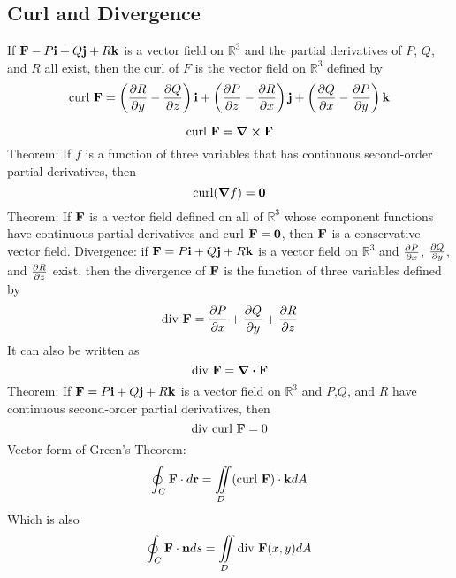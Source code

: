 \documentclass{article}
\begin{document}
    \subsection{Curl and Divergence}
    \begin{outline}
        \1 If \(\vb F-P\vb i+Q\vb j+R\vb k\) is a vector field on \(\mathbb R^3\) and the partial derivatives of $P$, $Q$, and $R$ all exist, then the curl of $F$ is the vector field on \(\mathbb R^3\) defined by \[\text{curl }\vb F=\left(\pdv{R}{y}-\pdv{Q}{z}\right)\vb i+\left(\pdv{P}{z}-\pdv{R}{x}\right)\vb j+\left(\pdv{Q}{x}-\pdv{P}{y}\right)\vb k\] 
    \end{outline}
        
        \begin{outline}
        \1 \[\text{curl }\vb F=\curl\vb F\]
        \1 Theorem: If $f$ is a function of three variables that has continuous second-order partial derivatives, then \[\text{curl}(\grad f)=\vb 0\]
        \1 Theorem: If \(\vb F\) is a vector field defined on all of \(\mathbb R^3\) whose component functions have continuous partial derivatives and curl \(\vb F=\vb 0\), then \(\vb F\) is a conservative vector field. 
        \1 Divergence: if \(\vb F=P\vb i+Q\vb j+R\vb k\) is a vector field on \(\mathbb R^3\) and \(\pdv{P}{x}\), \(\pdv{Q}{y}\), and \(\pdv{R}{z}\) exist, then the divergence of \(\vb F\) is the function of three variables defined by \[\text{div }\vb F=\pdv{P}{x}+\pdv{Q}{y}+\pdv{R}{z}\] It can also be written as \[\text{div }\vb F=\div \vb F\]
        \1 Theorem: If \(\vb F=P\vb i+Q\vb j+R\vb k\) is a vector field on \(\mathbb R^3\) and \(P\),\(Q\), and \(R\) have continuous second-order partial derivatives, then \[\text{div curl }\vb F=0\]
        \1 Vector form of Green's Theorem: \[\oint_C\vb F\cdot d\vb r=\iint\limits_D(\text{curl }\vb F)\cdot\vb kdA\]
        \1 Which is also \[\oint_C\vb F\cdot\vb nds=\iint\limits_D\text{div }\vb F(x,y)dA\]

    \end{outline}
\end{document}
